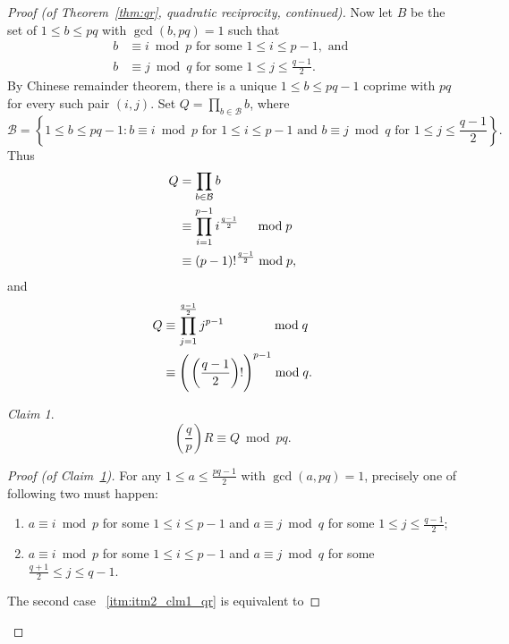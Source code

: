 \documentclass{amsbook}
\theoremstyle{plain}
\theoremstyle{definition}
\theoremstyle{remark}
\newtheorem{claim}[theorem]{Claim}
\numberwithin{equation}{chapter}
\numberwithin{figure}{chapter}
\newcommand{\sB}{\mathcal{B}}
\begin{document}
\begin{proof}[Proof {\rm (of Theorem~\ref{thm:qr}, quadratic reciprocity, continued)}]
  Now let $B$ be the set of $1 \leqslant b \leqslant pq$ with $\gcd (b, pq) = 1$ such that 
\begin{align}
b &\equiv i \bmod p \text{ for some } 1 \leqslant i \leqslant p-1, \text{ and } \\
b &\equiv j \bmod q \text{ for some } 1 \leqslant j \leqslant \frac{q-1}2.
\end{align}
By Chinese remainder theorem, there is a unique $1 \leqslant b \leqslant pq-1$ coprime with $pq$ for every such pair $(i,j)$. Set $Q = \prod_{b \in \sB} b$, where 
\[
\sB = \left\{ 1 \leqslant b \leqslant pq-1 : b \equiv i \bmod p \text{ for $1 \leqslant i \leqslant p-1$} \text{ and } b \equiv j \bmod q \text{ for $1 \leqslant j \leqslant \frac{q-1}2 $} \right\}.
\]
Thus
\begin{align}\label{eqn:Q_mod_p}
\begin{split}
  Q &= \prod_{b \in \sB} b \\
    &\equiv \prod_{i=1}^{p-1} i^{\frac{q-1}2} \hspace{4.5mm}\bmod p\\
    &\equiv (p-1)!^{\frac{q-1}2} \bmod p,
\end{split}
\end{align}
and
\begin{align}\label{eqn:Q_mod_q}
  Q &\equiv \prod_{j=1}^{\frac{q-1}2} j^{p-1} \hspace{13.3mm}\bmod q\\
    &\equiv \Bigg(\left(\frac{q-1}2\right)!\Bigg)^{p-1} \bmod q.
\end{align}
\begin{claim}\label{clm:clm1_qr}
\[
\left( \frac{q}p \right) R \equiv Q \bmod pq.
\]
\end{claim}
\begin{proof}[Proof {\rm (of Claim~\ref{clm:clm1_qr})}]
For any $1 \leqslant a \leqslant \frac{pq-1}2$ with $\gcd (a, pq) = 1$, precisely one of following two must happen: 
\begin{enumerate}[label=(\roman*)]
\item $a \equiv i \bmod p$ for some $1 \leqslant i \leqslant p - 1$ and 
 $a \equiv j \bmod q$ for some $1 \leqslant j \leqslant \frac{q - 1}2$; \label{itm:itm1_clm1_qr}
\item $a \equiv i \bmod p$ for some $1 \leqslant i \leqslant p - 1$ and 
 $a \equiv j \bmod q$ for some $\frac{q+1}2 \leqslant j \leqslant q-1$. \label{itm:itm2_clm1_qr}
\end{enumerate}
The second case ~\ref{itm:itm2_clm1_qr} is equivalent to 

\end{proof}
\end{proof}
\end{document}
